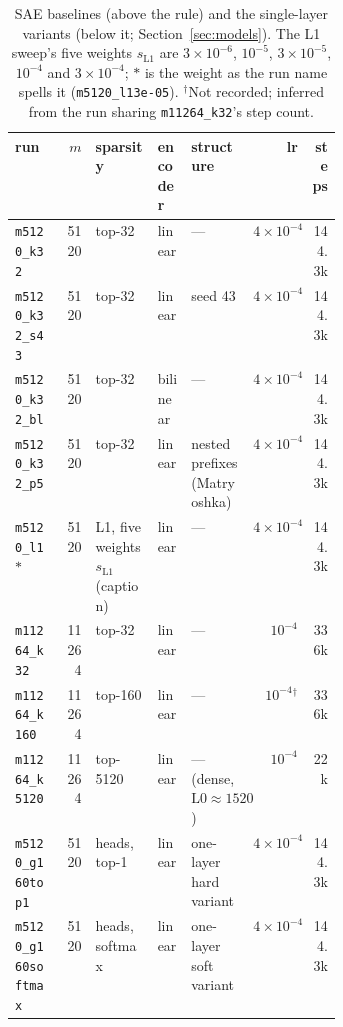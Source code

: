 \begin{table}[tp]
\vspace{8pt}
{\footnotesize\setlength{\tabcolsep}{4pt}%
\begin{tabular}{@{}lr>{\raggedright\arraybackslash}p{0.19\linewidth}l%
>{\raggedright\arraybackslash}p{0.19\linewidth}rr@{}}
\toprule
run & $m$ & sparsity & encoder & structure & lr & steps \\
\midrule
\texttt{m5120\_k32} & 5120 & top-32 & linear & --- & $4\times10^{-4}$ & 144.3k \\
\texttt{m5120\_k32\_s43} & 5120 & top-32 & linear & seed 43 & $4\times10^{-4}$ & 144.3k \\
\texttt{m5120\_k32\_bl} & 5120 & top-32 & bilinear & --- & $4\times10^{-4}$ & 144.3k \\
\texttt{m5120\_k32\_p5} & 5120 & top-32 & linear & 5 nested prefixes (Matryoshka) & $4\times10^{-4}$ & 144.3k \\
\texttt{m5120\_l1}$\ast$ & 5120 & L1, five weights $s_{\mathrm{L1}}$ (caption) & linear & --- & $4\times10^{-4}$ & 144.3k \\
\texttt{m11264\_k32} & 11264 & top-32 & linear & --- & $10^{-4}$ & 336k \\
\texttt{m11264\_k160} & 11264 & top-160 & linear & --- & $10^{-4}$$^\dagger$ & 336k \\
\texttt{m11264\_k5120} & 11264 & top-5120 & linear & --- (dense, $\mathrm{L0} \approx 1520$) & $10^{-4}$ & 22k \\
\midrule
\texttt{m5120\_g160top1} & 5120 & 160 heads, top-1 & linear & one-layer hard variant & $4\times10^{-4}$ & 144.3k \\
\texttt{m5120\_g160softmax} & 5120 & 160 heads, softmax & linear & one-layer soft variant & $4\times10^{-4}$ & 144.3k \\
\bottomrule
\end{tabular}}
\caption{SAE baselines (above the rule) and the single-layer variants
(below it; Section~\ref{sec:models}). The L1 sweep's five weights
$s_{\mathrm{L1}}$ are $3\times10^{-6}$, $10^{-5}$, $3\times10^{-5}$, $10^{-4}$
and $3\times10^{-4}$; $\ast$ is the weight as the run name spells it
(\texttt{m5120\_l13e-05}). $^\dagger$Not recorded; inferred from the run sharing
\texttt{m11264\_k32}'s step count.}
\label{tab:cfg-sae}
\end{table}
